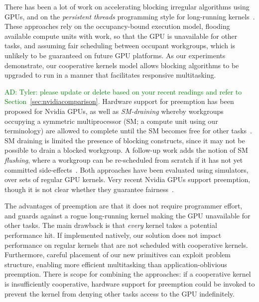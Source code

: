 \documentclass[parskip=half,sigconf,review, anonymous=true, acmcopyrightmode=none]{acmart}
\newcommand{\ADComment}[1]{\textcolor{green}{AD: #1}}
\newcommand{\nvidia}{Nvidia\xspace}
\begin{document}
%
There has been a lot of work on accelerating blocking irregular
algorithms using GPUs, and on the \emph{persistent threads}
programming style for long-running
kernels~\cite{owens-persistent,DBLP:conf/ipps/KaleemVPHP16,DBLP:conf/ipps/DavidsonBGO14,DBLP:conf/hipc/HarishN07,DBLP:journals/topc/MerrillGG15,DBLP:conf/egh/VineetHPN09,DBLP:conf/ppopp/NobariCKB12,DBLP:conf/hpcc/SolomonTT10a,DBLP:conf/popl/PrabhuRMH11,DBLP:conf/ppopp/Mendez-LojoBP12,DBLP:conf/oopsla/PaiP16,DBLP:conf/oopsla/SorensenDBGR16,DBLP:conf/egh/CedermanT08,TPO10,BNP12,Pannotia}.
These approaches rely on the occupancy-bound execution model, flooding
available compute units with work, so that the GPU is unavailable for
other tasks, and assuming fair scheduling between occupant workgroups,
which is unlikely to be guaranteed on future GPU platforms.
%
As our experiments demonstrate, our cooperative kernels model allows blocking algorithms
to be upgraded to run in a manner that facilitates responsive multitasking.


%
\ADComment{Tyler: please update or delete based on your recent readings and refer to Section~\ref{sec:nvidiacomparison}.}
%
Hardware support for preemption has been proposed for \nvidia GPUs,
as well as \emph{SM-draining}
whereby workgroups occupying a symmetric multiprocessor (SM; a compute
unit using our terminology) are allowed to complete until the SM becomes free for
other tasks~\cite{DBLP:conf/isca/TanasicGCRNV14}.  SM draining is limited the presence of blocking constructs, since it may not be possible to drain a blocked workgroup.
%
A follow-up work adds the notion of SM \emph{flushing},
where a workgroup can be re-scheduled
from scratch if it has not yet committed side-effects~\cite{DBLP:conf/asplos/ParkPM15}.  Both approaches have been evaluated
using simulators, over sets of regular GPU kernels.  Very recent \nvidia GPUs support
preemption, though it is not clear whether they guarantee fairness~\cite{PascalWhitepaper}.

The advantages of preemption are that it does not require programmer
effort, and guards against a rogue long-running kernel making the GPU
unavailable for other tasks.  The main drawback is that \emph{every}
kernel takes a potential performance hit.
%
If implemented natively, our solution does not impact performance on regular kernels that are not scheduled with cooperative kernels.
Furthermore, careful placement of
our new primitives can exploit problem structure, enabling more efficient multitasking than
application-oblivious preemption.  There is scope for combining the approaches: if a
cooperative kernel is insufficiently cooperative, hardware support for preemption could
be invoked to prevent the kernel from denying other tasks access to
the GPU indefinitely.
\end{document}
